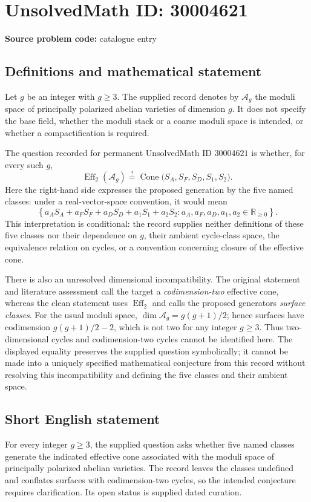 \documentclass[11pt]{article}
\newcommand{\R}{\mathbb{R}}
\begin{document}
\section*{UnsolvedMath ID: 30004621}
\textbf{Source problem code:} catalogue entry
\subsection{Definitions and mathematical statement}
Let \(g\) be an integer with \(g\geq 3\). The supplied record denotes by \(\mathcal A_g\) the moduli space of principally polarized abelian varieties of dimension \(g\). It does not specify the base field, whether the moduli stack or a coarse moduli space is intended, or whether a compactification is required.

The question recorded for permanent UnsolvedMath ID \(30004621\) is whether, for every such \(g\),
\[
\operatorname{Eff}_2(\mathcal A_g)
\stackrel{?}{=}
\operatorname{Cone}\bigl(S_A,S_F,S_D,S_1,S_2\bigr).
\]
Here the right-hand side expresses the proposed generation by the five named classes: under a real-vector-space convention, it would mean
\[
\left\{a_A S_A+a_F S_F+a_D S_D+a_1 S_1+a_2 S_2:
 a_A,a_F,a_D,a_1,a_2\in\R_{\geq0}\right\}.
\]
This interpretation is conditional: the record supplies neither definitions of these five classes nor their dependence on \(g\), their ambient cycle-class space, the equivalence relation on cycles, or a convention concerning closure of the effective cone.

There is also an unresolved dimensional incompatibility. The original statement and literature assessment call the target a \emph{codimension-two} effective cone, whereas the clean statement uses \(\operatorname{Eff}_2\) and calls the proposed generators \emph{surface classes}. For the usual moduli space, \(\dim\mathcal A_g=g(g+1)/2\); hence surfaces have codimension \(g(g+1)/2-2\), which is not two for any integer \(g\geq3\). Thus two-dimensional cycles and codimension-two cycles cannot be identified here. The displayed equality preserves the supplied question symbolically; it cannot be made into a uniquely specified mathematical conjecture from this record without resolving this incompatibility and defining the five classes and their ambient space.
\subsection{Short English statement}
For every integer \(g\geq3\), the supplied question asks whether five named classes generate the indicated effective cone associated with the moduli space of principally polarized abelian varieties. The record leaves the classes undefined and conflates surfaces with codimension-two cycles, so the intended conjecture requires clarification. Its open status is supplied dated curation.
\end{document}
